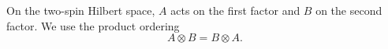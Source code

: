 \documentclass{article}
\begin{document}
On the two-spin Hilbert space, $A$ acts on the first factor and $B$ on the
second factor.  We use the product ordering
\begin{equation}
A\otimes B = B\otimes A .
\label{eq:tensor-exchange}
\end{equation}
\end{document}

